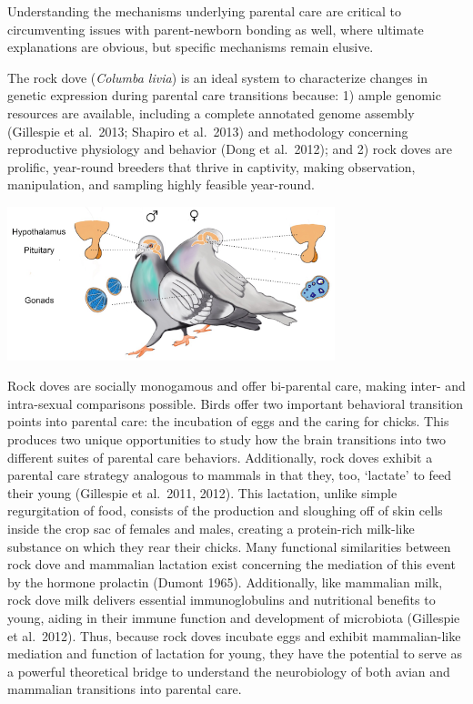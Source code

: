 \documentclass[10pt,letterpaper]{article}
\begin{document}
Understanding the mechanisms underlying parental care are critical to
circumventing issues with parent-newborn bonding as well, where ultimate
explanations are obvious, but specific mechanisms remain elusive.

The rock dove (\emph{Columba livia}) is an ideal system to characterize
changes in genetic expression during parental care transitions because:
1) ample genomic resources are available, including a complete annotated
genome assembly (Gillespie et al.~2013; Shapiro et al.~2013) and
methodology concerning reproductive physiology and behavior (Dong et
al.~2012); and 2) rock doves are prolific, year-round breeders that
thrive in captivity, making observation, manipulation, and sampling
highly feasible year-round.

\includegraphics[width=360px]{../figures/images/PigeonHPGaxis}

Rock doves are socially monogamous and offer bi-parental care, making
inter- and intra-sexual comparisons possible. Birds offer two important
behavioral transition points into parental care: the incubation of eggs
and the caring for chicks. This produces two unique opportunities to
study how the brain transitions into two different suites of parental
care behaviors. Additionally, rock doves exhibit a parental care
strategy analogous to mammals in that they, too, `lactate' to feed their
young (Gillespie et al.~2011, 2012). This lactation, unlike simple
regurgitation of food, consists of the production and sloughing off of
skin cells inside the crop sac of females and males, creating a
protein-rich milk-like substance on which they rear their chicks. Many
functional similarities between rock dove and mammalian lactation exist
concerning the mediation of this event by the hormone prolactin (Dumont
1965). Additionally, like mammalian milk, rock dove milk delivers
essential immunoglobulins and nutritional benefits to young, aiding in
their immune function and development of microbiota (Gillespie et
al.~2012). Thus, because rock doves incubate eggs and exhibit
mammalian-like mediation and function of lactation for young, they have
the potential to serve as a powerful theoretical bridge to understand
the neurobiology of both avian and mammalian transitions into parental
care.
\end{document}
